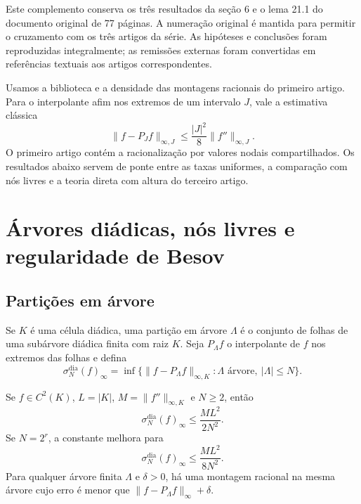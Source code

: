 

Este complemento conserva os três resultados da seção 6 e o lema 21.1 do documento original de 77 páginas. A numeração original é mantida para permitir o cruzamento com os três artigos da série. As hipóteses e conclusões foram reproduzidas integralmente; as remissões externas foram convertidas em referências textuais aos artigos correspondentes.

Usamos a biblioteca e a densidade das montagens racionais do primeiro artigo. Para o interpolante afim nos extremos de um intervalo $J$, vale a estimativa clássica
\begin{equation}
\|f-P_Jf\|_{\infty,J}\le\frac{|J|^2}{8}\|f''\|_{\infty,J}.
\label{complemento_original:eq:interpolation-remainder}
\end{equation}
O primeiro artigo contém a racionalização por valores nodais compartilhados. Os resultados abaixo servem de ponte entre as taxas uniformes, a comparação com nós livres e a teoria direta com altura do terceiro artigo.
\setcounter{section}{5}
\section{Árvores diádicas, nós livres e regularidade de Besov}
\label{complemento_original:sec:dyadic-trees}

\subsection{Partições em árvore}

Se $K$ é uma célula diádica, uma partição em árvore $\Lambda$ é o conjunto de folhas de uma subárvore diádica finita com raiz $K$. Seja $P_\Lambda f$ o interpolante de $f$ nos extremos das folhas e defina
\begin{equation}
 \sigma_N^{\mathrm{dia}}(f)_\infty
 =\inf\{\|f-P_\Lambda f\|_{\infty,K}:\Lambda\text{ árvore},\ |\Lambda|\le N\}.
 \label{complemento_original:eq:sigma-dyadic}
\end{equation}

\begin{theorem}\label{map:complemento_original:6.1}\label{complemento_original:thm:tree-rate}
Se $f\in C^2(K)$, $L=|K|$, $M=\|f''\|_{\infty,K}$ e $N\ge2$, então
\begin{equation}
 \sigma_N^{\mathrm{dia}}(f)_\infty\le\frac{ML^2}{2N^2}.
 \label{complemento_original:eq:tree-general}
\end{equation}
Se $N=2^r$, a constante melhora para
\begin{equation}
 \sigma_N^{\mathrm{dia}}(f)_\infty\le\frac{ML^2}{8N^2}.
 \label{complemento_original:eq:tree-power}
\end{equation}
Para qualquer árvore finita $\Lambda$ e $\delta>0$, há uma montagem racional na mesma árvore cujo erro é menor que $\|f-P_\Lambda f\|_\infty+\delta$.
\end{theorem}

